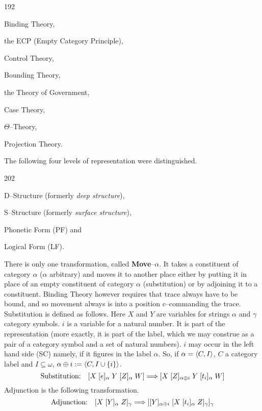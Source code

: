 \begin{dingautolist}{192}
\item Binding Theory,
\item the ECP (Empty Category Principle),
\item Control Theory,
\item Bounding Theory,
\item the Theory of Government,
\item Case Theory,
\item $\Theta$--Theory,
\item Projection Theory.
\end{dingautolist}
The following four  levels of representation were distinguished.
\begin{dingautolist}{202}
\item D--Structure (formerly {\it deep structure\/}),
\item S--Structure (formerly {\it surface structure\/}),
\item Phonetic Form (PF) and
\item Logical Form (LF).
\end{dingautolist}
There is only one transformation, called \textbf{Move}--$\alpha$. It
takes a constituent of category $\alpha$ ($\alpha$ arbitrary) and
moves it to another place either by putting it in place of an
empty constituent of category $\alpha$ (substitution) or by
adjoining it to a constituent. Binding Theory however requires
that trace always have to be bound, and so movement always is into
a position c--commanding the trace. Substitution is defined as
follows. Here $X$ and $Y$ are variables for strings $\alpha$ and
$\gamma$ category symbols. $i$ is a variable for a natural number.
It is part of the representation (more exactly, it is part of the
label, which we may construe as a pair of a category symbol and a
set of natural numbers). $i$ may occur in the left hand side (SC) 
namely, if it figures in the label $\alpha$.  So, if 
$\alpha = \langle C, I\rangle$, $C$ a category label and $I \subseteq 
\omega$, $\alpha \oplus i := \langle C, I \cup \{i\}\rangle$.
\begin{equation}
\mbox{\rm Substitution:} \quad
    [X\; [e]_{\alpha}\; Y\; [Z]_{\alpha}\; W] 
    \Longrightarrow
    [X\; [Z]_{\alpha\oplus i}\; Y\; [t_i]_{\alpha}\; W]
\end{equation}
Adjunction is the following transformation.
\begin{equation}
\mbox{\rm Adjunction:}\quad
    [X\; [Y]_{\alpha}\; Z]_{\gamma} \Longrightarrow
        [[Y]_{\alpha\oplus i}\; [X\; [t_i]_{\alpha}\; Z]_{\gamma}]_{\gamma}
\end{equation}
